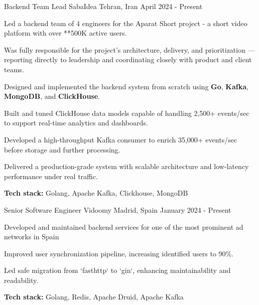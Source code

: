 

\begin{cventries}


  \cventry
    {Backend Team Lead} %
    {SabaIdea} %
    {Tehran, Iran} %
    {April 2024 - Present} %
    {
      \begin{cvitems} %
        \item Led a backend team of 4 engineers for the Aparat Short project - a short video platform with over **500K active users.
        \item Was fully responsible for the project’s architecture, delivery, and prioritization — reporting directly to leadership and coordinating closely with product and client teams.
        \item Designed and implemented the backend system from scratch using \textbf{Go}, \textbf{Kafka}, \textbf{MongoDB}, and \textbf{ClickHouse}.
        \item Built and tuned ClickHouse data models capable of handling 2,500+ events/sec to support real-time analytics and dashboards.
        \item Developed a high-throughput Kafka consumer to enrich 35,000+ events/sec before storage and further processing.
        \item Delivered a production-grade system with scalable architecture and low-latency performance under real traffic.
        \item \textbf{Tech stack:} Golang, Apache Kafka, Clickhouse, MongoDB
      \end{cvitems}
    }

    
  \cventry
    {Senior Software Engineer} %
    {Vidoomy} %
    {Madrid, Spain} %
    {January 2024 - Present} %
    {
      \begin{cvitems} %
        \item Developed and maintained backend services for one of the most prominent ad networks in Spain
        \item Improved user synchronization pipeline, increasing identified users to 90\%.
        \item Led safe migration from `fasthttp` to `gin`, enhancing maintainability and readability.
        \item \textbf{Tech stack:} Golang, Redis, Apache Druid, Apache Kafka
      \end{cvitems}
    }


\end{cventries}
